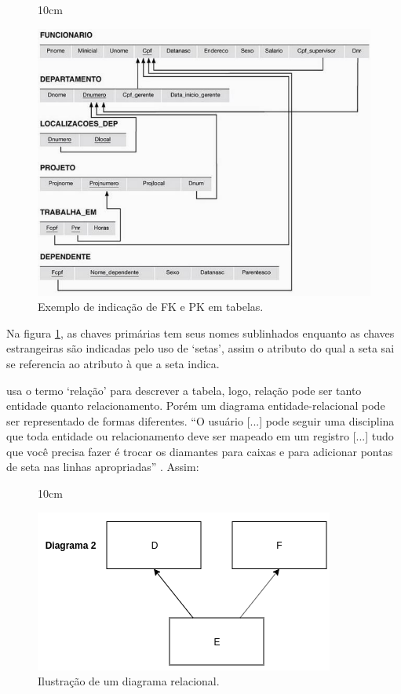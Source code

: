 \begin{figure}[!ht]{10cm}
  \caption{Exemplo de indicação de FK e PK em tabelas.} \label{fk_pk}
  \includegraphics[width=1\hsize]{figuras/fk_pk.png}
\end{figure}
Na figura \ref{fk_pk}, as chaves primárias tem seus nomes sublinhados enquanto as chaves estrangeiras são indicadas pelo uso de `setas', assim o atributo do qual a seta sai se referencia ao atributo à que a seta indica.


 usa o termo `relação' para descrever a tabela, logo, relação pode ser tanto entidade quanto relacionamento. Porém um diagrama entidade-relacional pode ser representado de formas diferentes. ``O usuário [...] pode seguir uma disciplina que toda entidade ou relacionamento deve ser mapeado em um registro [...] tudo que você precisa fazer é trocar os diamantes para caixas e para adicionar pontas de seta nas linhas apropriadas'' \cite[p.32]{chen1976entity}. Assim:

\begin{figure}[!ht]{10cm}
  \caption{Ilustração de um diagrama relacional.} \label{relacional_b}
  \includegraphics[width=0.5\hsize]{figuras/relacional_b.png}
\end{figure}

